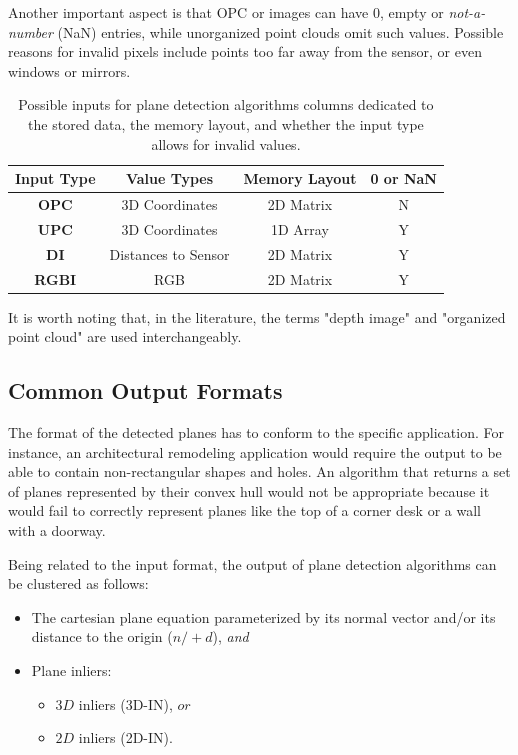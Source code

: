 \documentclass[main.tex]{subfiles}
\begin{document}
Another important aspect is that OPC or images can have 0, empty or \textit{not-a-number} (NaN) entries, while unorganized point clouds
omit such values. Possible reasons for invalid pixels include points too far away from the sensor, or even windows or mirrors.
\begin{table}[H]
    \centering
    \begin{tabular}{c|c|c|c}
        \textbf{Input Type} & \textbf{Value Types} & \textbf{Memory Layout} & \textbf{0 or NaN} \\ \hline
        \textbf{OPC}        & 3D Coordinates       & 2D Matrix              & N                 \\
        \textbf{UPC}        & 3D Coordinates       & 1D Array               & Y                 \\
        \textbf{DI}         & Distances to Sensor  & 2D Matrix              & Y                 \\
        \textbf{RGBI}       & RGB                  & 2D Matrix              & Y
    \end{tabular}
    \caption{Possible inputs for plane detection algorithms columns dedicated to the stored data, the memory layout, and whether
        the input type allows for invalid values.}
    \label{tab:inputs}
\end{table}
It is worth noting that, in the literature, the terms "depth image" and "organized point cloud" are used interchangeably.

\subsection{Common Output Formats}
\label{subsec:output}
The format of the detected planes has to conform to the specific application. For instance, an architectural remodeling application
would require the output to be able to contain non-rectangular shapes and holes.
An algorithm that returns a set of planes represented by their convex hull would not be appropriate because it
would fail to correctly represent planes like the top of a corner desk or a wall with a doorway.

Being related to the input format, the output of plane detection algorithms can be clustered as follows:
\begin{itemize}
    \item The cartesian plane equation parameterized by its normal vector and/or its distance to the origin ($n/+d$), \textit{and}
    \item Plane inliers:
          \begin{itemize}
              \item $3D$ inliers (3D-IN), $or$
              \item $2D$ inliers (2D-IN).
          \end{itemize}
\end{itemize}
\end{document}
